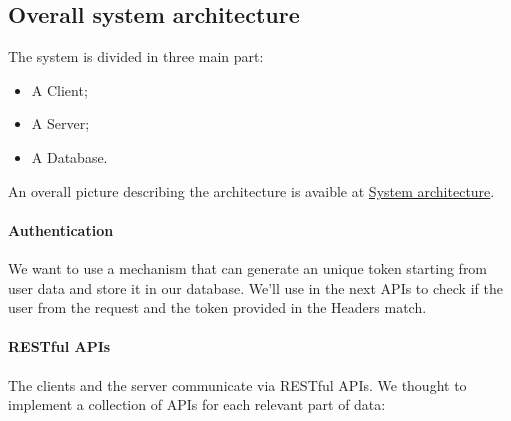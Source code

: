 \documentclass[../../main]{subfiles}
\begin{document}
\label{ss:overall-system-architecture}
\subsection{Overall system architecture}
The system is divided in three main part:
    \begin{itemize}
        \item A Client;
        \item A Server;
        \item A Database.
    \end{itemize}

An overall picture describing the architecture is avaible at \hyperref[fig:simple_system_architecture]{System architecture}.

\paragraph*{Authentication}
We want to use a mechanism that can generate an unique token starting from user data and store it in our database. We'll use in the next APIs to check if the user from the request and the token provided in the Headers match.

\paragraph*{RESTful APIs}
The clients and the server communicate via RESTful APIs. We thought to implement a collection of APIs for each relevant part of data:
\end{document}
